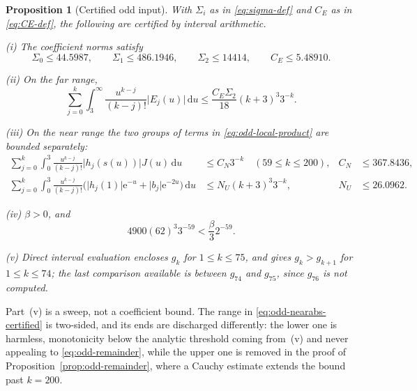 \documentclass[11pt]{amsart}
\theoremstyle{plain}
\newtheorem{proposition}[theorem]{Proposition}
\theoremstyle{definition}
\newcommand{\e}{\mathrm e}
\newcommand{\dd}{\,\mathrm d}
\newcommand{\abs}[1]{\lvert #1\rvert}
\begin{document}
\begin{proposition}[Certified odd input]\label{prop:odd-certified}
With $\Sigma_i$ as in \eqref{eq:sigma-def} and $C_E$ as in
\eqref{eq:CE-def}, the following are certified by interval arithmetic.

\noindent(i) The coefficient norms satisfy
\begin{equation}\label{eq:odd-certified-coefficients}
 \Sigma_0\leq44.5987,
 \qquad \Sigma_1\leq486.1946,
 \qquad \Sigma_2\leq14414,
 \qquad C_E\leq5.48910.
\end{equation}

\noindent(ii) On the far range,
\begin{equation}\label{eq:odd-far-certified}
 \sum_{j=0}^k\int_3^\infty
  \frac{u^{k-j}}{(k-j)!}\abs{E_j(u)}\dd u
 \leq \frac{C_E\Sigma_2}{18}(k+3)^3 3^{-k}.
\end{equation}

\noindent(iii) On the near range the two groups of terms in
\eqref{eq:odd-local-product} are bounded separately:
\begin{align}
 \sum_{j=0}^k\int_0^3\frac{u^{k-j}}{(k-j)!}\abs{h_j(s(u))}J(u)\dd u
 &\leq C_N3^{-k}\quad(59\leq k\leq200),
 & C_N&\leq367.8436,
 \label{eq:odd-nearabs-certified}\\
 \sum_{j=0}^k\int_0^3\frac{u^{k-j}}{(k-j)!}
  \bigl(\abs{h_j(1)}\e^{-u}+\abs{b_j}\e^{-2u}\bigr)\dd u
 &\leq N_U(k+3)^3 3^{-k},
 & N_U&\leq26.0962.
 \label{eq:odd-near-main}
\end{align}

\noindent(iv) $\beta>0$, and
\begin{equation}\label{eq:odd-base-59}
  4900(62)^3 3^{-59}<\frac{\beta}{3}2^{-59}.
\end{equation}

\noindent(v) Direct interval evaluation encloses $g_k$ for
$1\leq k\leq75$, and gives $g_k>g_{k+1}$ for $1\leq k\leq74$; the last
comparison available is between $g_{74}$ and $g_{75}$, since $g_{76}$ is not
computed.
\end{proposition}

\noindent
Part~(v) is a sweep, not a coefficient bound. The range in
\eqref{eq:odd-nearabs-certified} is two-sided, and its ends are discharged
differently: the lower one is harmless, monotonicity below the analytic
threshold coming from~(v) and never appealing to \eqref{eq:odd-remainder},
while the upper one is removed in the proof of
Proposition~\ref{prop:odd-remainder}, where a Cauchy estimate extends the
bound past $k=200$.
\end{document}
